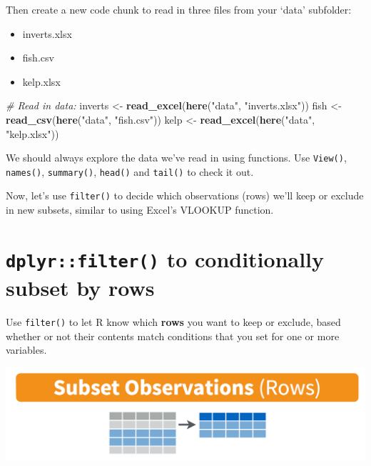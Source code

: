 \documentclass[]{book}
\newenvironment{Shaded}{\begin{snugshade}}{\end{snugshade}}
\newcommand{\CommentTok}[1]{\textcolor[rgb]{0.56,0.35,0.01}{\textit{#1}}}
\newcommand{\KeywordTok}[1]{\textcolor[rgb]{0.13,0.29,0.53}{\textbf{#1}}}
\newcommand{\NormalTok}[1]{#1}
\newcommand{\StringTok}[1]{\textcolor[rgb]{0.31,0.60,0.02}{#1}}
\providecommand{\tightlist}{%
  \setlength{\itemsep}{0pt}\setlength{\parskip}{0pt}}
\begin{document}
Then create a new code chunk to read in three files from your `data' subfolder:

\begin{itemize}
\tightlist
\item
  inverts.xlsx
\item
  fish.csv
\item
  kelp.xlsx
\end{itemize}

\begin{Shaded}
\begin{Highlighting}[]
\CommentTok{# Read in data: }
\NormalTok{inverts <-}\StringTok{ }\KeywordTok{read_excel}\NormalTok{(}\KeywordTok{here}\NormalTok{(}\StringTok{"data"}\NormalTok{, }\StringTok{"inverts.xlsx"}\NormalTok{))}
\NormalTok{fish <-}\StringTok{ }\KeywordTok{read_csv}\NormalTok{(}\KeywordTok{here}\NormalTok{(}\StringTok{"data"}\NormalTok{, }\StringTok{"fish.csv"}\NormalTok{))}
\NormalTok{kelp <-}\StringTok{ }\KeywordTok{read_excel}\NormalTok{(}\KeywordTok{here}\NormalTok{(}\StringTok{"data"}\NormalTok{, }\StringTok{"kelp.xlsx"}\NormalTok{))}
\end{Highlighting}
\end{Shaded}

We should always explore the data we've read in using functions. Use \texttt{View()}, \texttt{names()}, \texttt{summary()}, \texttt{head()} and \texttt{tail()} to check it out.

Now, let's use \texttt{filter()} to decide which observations (rows) we'll keep or exclude in new subsets, similar to using Excel's VLOOKUP function.

\hypertarget{dplyrfilter-to-conditionally-subset-by-rows}{%
\section{\texorpdfstring{\texttt{dplyr::filter()} to conditionally subset by rows}{dplyr::filter() to conditionally subset by rows}}\label{dplyrfilter-to-conditionally-subset-by-rows}}

Use \texttt{filter()} to let R know which \textbf{rows} you want to keep or exclude, based whether or not their contents match conditions that you set for one or more variables.

\includegraphics{img/rstudio-cheatsheet-filter.png}
\end{document}
